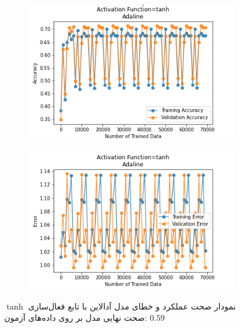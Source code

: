 \documentclass[12pt, a4paper]{article}
\begin{document}
\clearpage

\begin{figure}[h]
    \begin{subfigure}{0.45\linewidth}
        \centering
        \includegraphics[width=\linewidth]{images/5/adaline/activation_func/tanh_acc.png}
    \end{subfigure}
    \hfil
    \begin{subfigure}{0.45\linewidth}
        \centering
        \includegraphics[width=\linewidth]{images/5/adaline/activation_func/tanh_error.png}
    \end{subfigure}
    \caption{نمودار صحت عملکرد‌ و خطای مدل آدالاین با تابع فعال‌سازی $\tanh$
    \newline
    صحت نهایی مدل بر روی داده‌های آزمون: $0.59$}
\end{figure}

\vspace{1cm}
\end{document}
